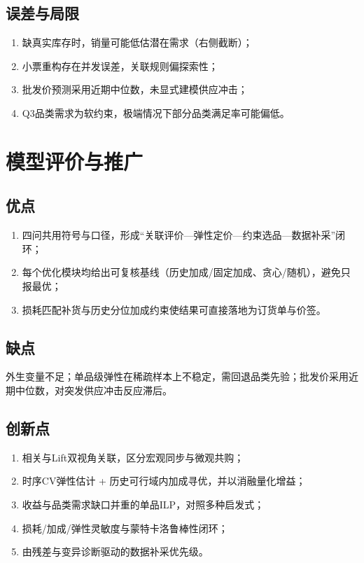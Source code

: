 \documentclass[UTF8,a4paper,12pt]{ctexart}
\begin{document}
\subsection{误差与局限}
\begin{enumerate}[leftmargin=2em]
\item 缺真实库存时，销量可能低估潜在需求（右侧截断）；
\item 小票重构存在并发误差，关联规则偏探索性；
\item 批发价预测采用近期中位数，未显式建模供应冲击；
\item Q3品类需求为软约束，极端情况下部分品类满足率可能偏低。
\end{enumerate}

\section{模型评价与推广}
\subsection{优点}
\begin{enumerate}[leftmargin=2em]
\item 四问共用符号与口径，形成``关联评价—弹性定价—约束选品—数据补采''闭环；
\item 每个优化模块均给出可复核基线（历史加成/固定加成、贪心/随机），避免只报最优；
\item 损耗匹配补货与历史分位加成约束使结果可直接落地为订货单与价签。
\end{enumerate}
\subsection{缺点}
外生变量不足；单品级弹性在稀疏样本上不稳定，需回退品类先验；批发价采用近期中位数，对突发供应冲击反应滞后。
\subsection{创新点}
\begin{enumerate}[leftmargin=2em]
\item 相关与Lift双视角关联，区分宏观同步与微观共购；
\item 时序CV弹性估计 + 历史可行域内加成寻优，并以消融量化增益；
\item 收益与品类需求缺口并重的单品ILP，对照多种启发式；
\item 损耗/加成/弹性灵敏度与蒙特卡洛鲁棒性闭环；
\item 由残差与变异诊断驱动的数据补采优先级。
\end{enumerate}
\end{document}
